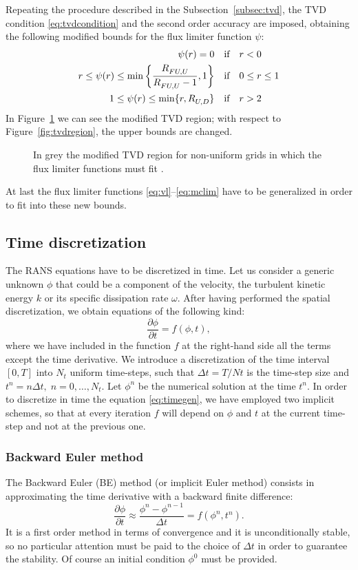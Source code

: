 Repeating the procedure described in the Subsection~\ref{subsec:tvd}, the TVD 
condition \eqref{eq:tvdcondition} and the second order accuracy are imposed, 
obtaining the following modified bounds for the flux limiter function $\psi$:
\begin{align}
\notag \psi(r) = 0 \quad &\text{if} \quad r < 0\\
r \leq \psi(r) \leq \min \bigg \{\frac{\RFUU}{\RFUU - 1}, 1 \bigg \} \quad 
&\text{if} \quad 0 \leq r \leq 1\\
\notag 1 \leq \psi(r) \leq \min \{r,\RUD \} \quad &\text{if} \quad r > 2
\end{align}
In Figure~\ref{fig:tvdregionhou} we can see the modified TVD region; with 
respect to Figure~\ref{fig:tvdregion}, the upper bounds are changed.
\begin{figure}[t]
	\centering
	
	\caption[Modified TVD region]{In grey the modified TVD region for 
	non-uniform grids in which the flux limiter functions must fit 
	\cite{nonunif:hou}.}
	\label{fig:tvdregionhou}
\end{figure} 
At last the flux limiter functions \eqref{eq:vl}--\eqref{eq:mclim} have to be 
generalized in order to fit into these new bounds.
%
\subsection{Time discretization} \label{subsec:time}
The RANS equations have to be discretized in time. Let us consider a 
generic unknown $\phi$ that could be a component of the velocity, the turbulent 
kinetic energy $k$ or its specific dissipation rate $\omega$. After having 
performed the spatial discretization, we obtain equations of the following kind:
\begin{equation} \label{eq:timegen}
\frac{\partial \phi}{\partial t} = f(\phi, t),
\end{equation}
where we have included in the function $f$ at the right-hand side all the terms 
except the time derivative. We introduce a discretization of the time 
interval $[0, T]$ into $N_t$ uniform time-steps, such that $\Delta t = T/Nt$ is 
the time-step size and $t^n=n\Delta t, \; n=0,\dots,N_t$. Let $\phi^n$ be the 
numerical solution at the time $t^n$. In order to 
discretize in time the equation \eqref{eq:timegen}, we have employed two 
implicit schemes, so that at every iteration $f$ will depend on $\phi$ and $t$ 
at the current time-step and not at the previous one.
%
\subsubsection{Backward Euler method}
The Backward Euler (BE) method (or implicit Euler method) consists in 
approximating the time derivative with a backward finite difference:
\begin{equation} \label{eq:be}
\frac{\partial \phi}{\partial t} \approx \frac{	\phi^n-\phi^{n-1}}{\Delta 
	t} = f(\phi^n, t^n).
\end{equation}
It is a first order method in terms of convergence and it is 
unconditionally stable, so no particular attention must be paid to the choice 
of $\Delta t$ in order to guarantee the stability. Of course an initial 
condition $\phi^0$ must be provided.
%
